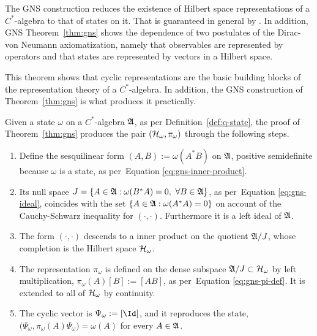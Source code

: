 \begin{remark}
	\label{rem:gns-significance}
	The GNS construction reduces the existence of Hilbert space representations of a $C^*$-algebra to that of states on it. That is guaranteed in general by \cite[Prop.~1.6.4, Appendix~C]{strocchiIntroductionMathematicalStructure2005}. In addition, GNS Theorem~\ref{thm:gns} shows the dependence of two postulates of the Dirac-von Neumann axiomatization, namely that observables are represented by operators and that states are represented by vectors in a Hilbert space.
\end{remark}

This theorem shows that cyclic representations are the basic building blocks of the representation theory of a $C^*$-algebra. In addition, the GNS construction of Theorem~\ref{thm:gns} is what produces it practically.

\begin{remark}
	\label{rem:gns-construction-recap}
	Given a state $\omega$ on a $C^*$-algebra $\mathfrak{A}$, as per Definition~\ref{def:q-state}, the proof of Theorem~\ref{thm:gns} produces the pair $(\H_\omega,\pi_\omega)$ through the following steps.
	\begin{enumerate}
		\item Define the sesquilinear form $(A,B) := \omega(A^*B)$ on $\mathfrak{A}$, positive semidefinite because $\omega$ is a state, as per~Equation \eqref{eq:gns-inner-product}.
		\item Its null space $J = \{A \in \mathfrak{A} : \omega(B^*A)=0,\ \forall B \in \mathfrak{A}\}$, as per~Equation \eqref{eq:gns-ideal}, coincides with the set $\{A \in \mathfrak{A} : \omega(A^*A)=0\}$ on account of the Cauchy-Schwarz inequality for $(\cdot,\cdot)$. Furthermore it is a left ideal of $\mathfrak{A}$.
		\item The form $(\cdot,\cdot)$ descends to a inner product on the quotient $\mathfrak{A}/J$, whose completion is the Hilbert space $\H_\omega$.
		\item The representation $\pi_\omega$ is defined on the dense subspace $\A/J \subset \H_\omega$ by left multiplication, $\pi_\omega(A)[B] := [AB]$, as per~Equation \eqref{eq:gns-pi-def}. It is extended to all of $\H_\omega$ by continuity.
		\item The cyclic vector is $\Psi_\omega := [\Id]$, and it reproduces the state, $\big(\Psi_\omega,\pi_\omega(A)\Psi_\omega\big) = \omega(A)$ for every $A \in \mathfrak{A}$.
	\end{enumerate}
\end{remark}

